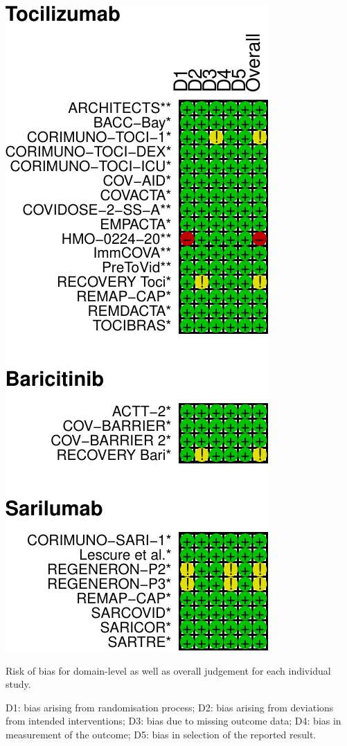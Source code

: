 \documentclass[
  12pt,
]{article}
\begin{document}
\begin{center}\includegraphics{supplementary_material_files/figure-latex/unnamed-chunk-7-1} \end{center}

Risk of bias for domain-level as well as overall judgement for each
individual study.

D1: bias arising from randomisation process; D2: bias arising from
deviations from intended interventions; D3: bias due to missing outcome
data; D4: bias in measurement of the outcome; D5: bias in selection of
the reported result.
\end{document}
